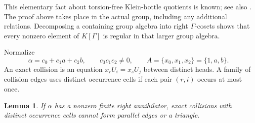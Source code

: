 \documentclass[11pt,a4paper,oneside]{report}
\newtheorem{lemma}[theorem]{Lemma}
\theoremstyle{definition}
\theoremstyle{remark}
\begin{document}
This elementary fact about torsion-free Klein-bottle quotients is known;
see also \cite[Remark~2.1]{B:AJ4}. The proof above takes place in the actual
group, including any additional relations. Decomposing a containing
group algebra into right \(\Gamma\)-cosets shows that every nonzero
element of \(K[\Gamma]\) is regular in that larger group algebra.

Normalize
\[
 \alpha=c_0+c_1a+c_2b,\qquad c_0c_1c_2\ne0,\qquad
 A=\{x_0,x_1,x_2\}=\{1,a,b\}.
\]
An exact collision is an equation \(x_rU_i=x_sU_j\) between distinct
heads. A family of collision edges uses distinct occurrence cells if
each pair \((r,i)\) occurs at most once.

\begin{lemma}\label{M11:six:short-cycles}
If \(\alpha\) has a nonzero finite right annihilator, exact collisions
with distinct occurrence cells cannot form parallel edges or a triangle.
\end{lemma}
\end{document}
